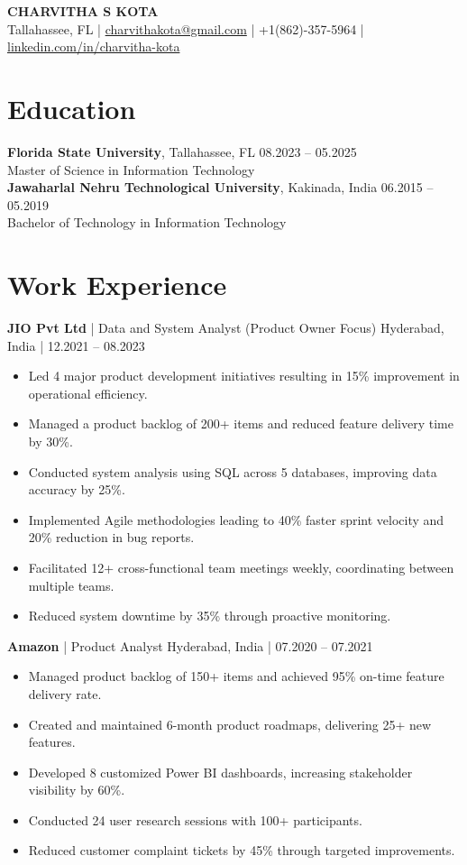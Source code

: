 \documentclass[10pt, letterpaper]{article}
\begin{document}
\begin{center}
    \textbf{\LARGE CHARVITHA S KOTA}\\
    Tallahassee, FL | \href{mailto:charvithakota@gmail.com}{charvithakota@gmail.com} | +1(862)-357-5964 | \href{https://www.linkedin.com/in/charvitha-kota}{linkedin.com/in/charvitha-kota}
\end{center}

\section{Education}
\textbf{Florida State University}, Tallahassee, FL \hfill 08.2023 -- 05.2025\\
Master of Science in Information Technology\\
\textbf{Jawaharlal Nehru Technological University}, Kakinada, India \hfill 06.2015 -- 05.2019\\
Bachelor of Technology in Information Technology

\section{Work Experience}
\textbf{JIO Pvt Ltd} | Data and System Analyst (Product Owner Focus) \hfill Hyderabad, India | 12.2021 -- 08.2023\\
\begin{itemize}[noitemsep]
    \item Led 4 major product development initiatives resulting in 15\% improvement in operational efficiency.
    \item Managed a product backlog of 200+ items and reduced feature delivery time by 30\%.
    \item Conducted system analysis using SQL across 5 databases, improving data accuracy by 25\%.
    \item Implemented Agile methodologies leading to 40\% faster sprint velocity and 20\% reduction in bug reports.
    \item Facilitated 12+ cross-functional team meetings weekly, coordinating between multiple teams.
    \item Reduced system downtime by 35\% through proactive monitoring.
\end{itemize}

\textbf{Amazon} | Product Analyst \hfill Hyderabad, India | 07.2020 -- 07.2021\\
\begin{itemize}[noitemsep]
    \item Managed product backlog of 150+ items and achieved 95\% on-time feature delivery rate.
    \item Created and maintained 6-month product roadmaps, delivering 25+ new features.
    \item Developed 8 customized Power BI dashboards, increasing stakeholder visibility by 60\%.
    \item Conducted 24 user research sessions with 100+ participants.
    \item Reduced customer complaint tickets by 45\% through targeted improvements.
\end{itemize}
\end{document}
